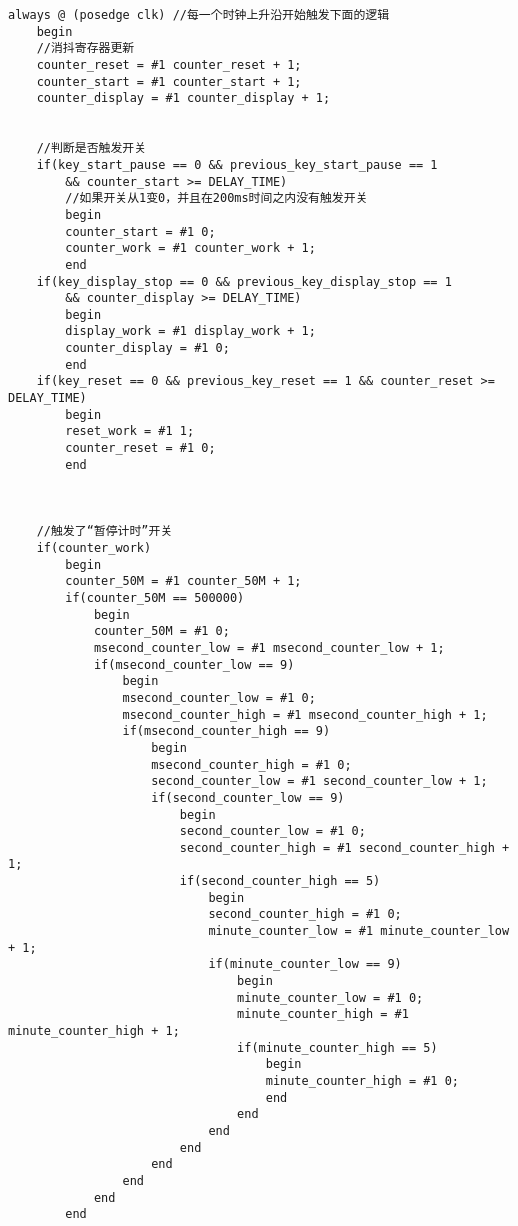 \documentclass[UTF8]{ctexart}
\begin{document}
\begin{verbatim}
always @ (posedge clk) //每一个时钟上升沿开始触发下面的逻辑
    begin
    //消抖寄存器更新
    counter_reset = #1 counter_reset + 1;
    counter_start = #1 counter_start + 1;
    counter_display = #1 counter_display + 1;


    //判断是否触发开关
    if(key_start_pause == 0 && previous_key_start_pause == 1 
        && counter_start >= DELAY_TIME)
        //如果开关从1变0，并且在200ms时间之内没有触发开关
        begin
        counter_start = #1 0;
        counter_work = #1 counter_work + 1;
        end
    if(key_display_stop == 0 && previous_key_display_stop == 1 
        && counter_display >= DELAY_TIME)
        begin
        display_work = #1 display_work + 1;
        counter_display = #1 0;
        end
    if(key_reset == 0 && previous_key_reset == 1 && counter_reset >= DELAY_TIME)
        begin
        reset_work = #1 1;
        counter_reset = #1 0;
        end



    //触发了“暂停计时”开关
    if(counter_work)
        begin
        counter_50M = #1 counter_50M + 1;
        if(counter_50M == 500000)
            begin
            counter_50M = #1 0;
            msecond_counter_low = #1 msecond_counter_low + 1;
            if(msecond_counter_low == 9)
                begin
                msecond_counter_low = #1 0;
                msecond_counter_high = #1 msecond_counter_high + 1;
                if(msecond_counter_high == 9)
                    begin
                    msecond_counter_high = #1 0;
                    second_counter_low = #1 second_counter_low + 1;
                    if(second_counter_low == 9)
                        begin
                        second_counter_low = #1 0;
                        second_counter_high = #1 second_counter_high + 1;
                        if(second_counter_high == 5)
                            begin
                            second_counter_high = #1 0;
                            minute_counter_low = #1 minute_counter_low + 1;
                            if(minute_counter_low == 9)
                                begin
                                minute_counter_low = #1 0;
                                minute_counter_high = #1 minute_counter_high + 1;
                                if(minute_counter_high == 5)
                                    begin
                                    minute_counter_high = #1 0;
                                    end
                                end
                            end
                        end
                    end
                end
            end
        end


\end{verbatim}
\end{document}
